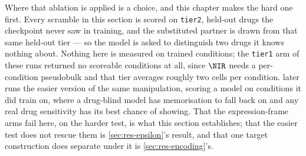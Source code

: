 Where that ablation is applied is a choice, and this chapter makes the hard one
first. Every scramble in this section is scored on \texttt{tier2}, held-out
drugs the checkpoint never saw in training, and the substituted partner is drawn
from that same held-out tier --- so the model is asked to distinguish two drugs
it knows nothing about. Nothing here is measured on trained conditions; the
\texttt{tier1} arm of these runs returned no scoreable conditions at all, since
$\NIR$ needs a per-condition pseudobulk and that tier averages roughly two cells
per condition.  later runs the easier version of the same
manipulation, scoring a model on conditions it did train on, where a drug-blind
model has memorisation to fall back on and any real drug sensitivity has its
best chance of showing. That the expression-frame arms fail here, on the harder
test, is what this section establishes; that the easier test does not rescue
them is \cref{sec:res-epsilon}'s result, and that one target construction does
separate under it is \cref{sec:res-encoding}'s.

